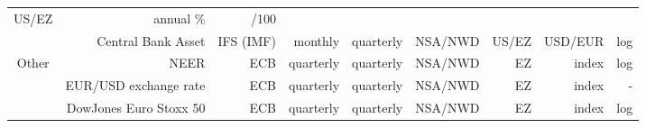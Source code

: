 \documentclass[11pt,a4paper]{article}
\begin{document}
\begin{table}[h]
{\begin{tabular}{crrrrrrrr}
      US/EZ &
      annual \% &
      /100
      \\
     &
      Central Bank Asset &
      IFS (IMF) &
      monthly &
      quarterly &
      NSA/NWD  &
      US/EZ &
      USD/EUR &
      log
      \\
      \midrule
    \multirow{3}[6]{*}{Other} &
      NEER &
      ECB &
      quarterly &
      quarterly &
      NSA/NWD  &
      EZ &
      index &
      log
      \\
     &
      EUR/USD exchange rate &
      ECB &
      quarterly &
      quarterly &
      NSA/NWD  &
      EZ &
      index &
      -
      \\
     &
      DowJones Euro Stoxx 50 &
      ECB &
      quarterly &
      quarterly &
      NSA/NWD  &
      EZ &
      index &
      log
      \\
    \bottomrule
    \end{tabular}
    }
 \label{tab:addlabel}
\end{table}
\end{document}
